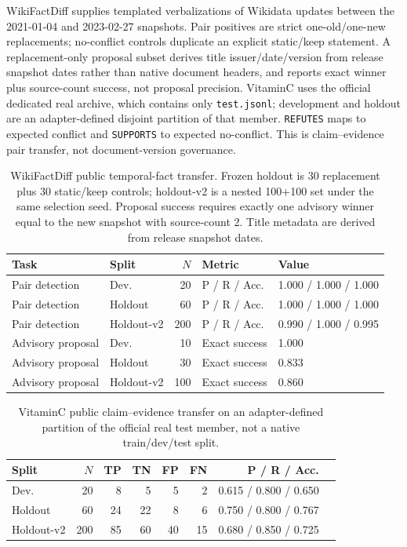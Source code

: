 \documentclass[conference]{IEEEtran}
\begin{document}
WikiFactDiff supplies templated verbalizations of Wikidata updates between the 2021-01-04 and 2023-02-27 snapshots. Pair positives are strict one-old/one-new replacements; no-conflict controls duplicate an explicit static/keep statement. A replacement-only proposal subset derives title issuer/date/version from release snapshot dates rather than native document headers, and reports exact winner plus source-count success, not proposal precision. VitaminC uses the official dedicated real archive, which contains only \texttt{test.jsonl}; development and holdout are an adapter-defined disjoint partition of that member. \texttt{REFUTES} maps to expected conflict and \texttt{SUPPORTS} to expected no-conflict. This is claim--evidence pair transfer, not document-version governance.

\begin{table}[t]
\caption{WikiFactDiff public temporal-fact transfer. Frozen holdout is 30 replacement plus 30 static/keep controls; holdout-v2 is a nested 100+100 set under the same selection seed. Proposal success requires exactly one advisory winner equal to the new snapshot with source-count 2. Title metadata are derived from release snapshot dates.}
\label{tab:wfd-public}
\centering
\small
\begin{tabular}{llrll}
\toprule
Task & Split & $N$ & Metric & Value \\
\midrule
Pair detection & Dev. & 20 & P / R / Acc. & 1.000 / 1.000 / 1.000 \\
Pair detection & Holdout & 60 & P / R / Acc. & 1.000 / 1.000 / 1.000 \\
Pair detection & Holdout-v2 & 200 & P / R / Acc. & 0.990 / 1.000 / 0.995 \\
Advisory proposal & Dev. & 10 & Exact success & 1.000 \\
Advisory proposal & Holdout & 30 & Exact success & 0.833 \\
Advisory proposal & Holdout-v2 & 100 & Exact success & 0.860 \\
\bottomrule
\end{tabular}
\end{table}

\begin{table}[t]
\caption{VitaminC public claim--evidence transfer on an adapter-defined partition of the official real test member, not a native train/dev/test split.}
\label{tab:vitaminc-public}
\centering
\small
\begin{tabular}{lrrrrrrr}
\toprule
Split & $N$ & TP & TN & FP & FN & P / R / Acc. \\
\midrule
Dev. & 20 & 8 & 5 & 5 & 2 & 0.615 / 0.800 / 0.650 \\
Holdout & 60 & 24 & 22 & 8 & 6 & 0.750 / 0.800 / 0.767 \\
Holdout-v2 & 200 & 85 & 60 & 40 & 15 & 0.680 / 0.850 / 0.725 \\
\bottomrule
\end{tabular}
\end{table}
\end{document}
